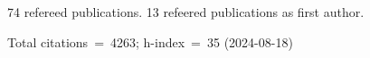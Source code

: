 74 refereed publications. 13 refeered publications as first author.

Total citations~=~4263; h-index~=~35 (2024-08-18)